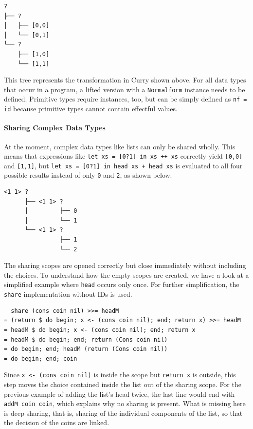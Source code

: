 \documentclass[a4paper, 11pt, fleqn, twoside]{scrreprt}
\newcommand{\hinl}[1]{\texttt{#1}}
\begin{document}
\begin{verbatim}
? 
├── ? 
│   ├── [0,0]
│   └── [0,1]
└── ? 
    ├── [1,0]
    └── [1,1]
\end{verbatim}

This tree represents the transformation in Curry shown above.
For all data types that occur in a program, a lifted version with a \hinl{Normalform} instance needs to be defined.
Primitive types require instances, too, but can be simply defined as \hinl{nf = id} because primitive types cannot contain effectful values.

\paragraph{Sharing Complex Data Types}
At the moment, complex data types like lists can only be shared wholly.
This means that expressions like \hinl{let xs = [0?1] in xs ++ xs} correctly yield \hinl{[0,0]} and \hinl{[1,1]}, but \hinl{let xs = [0?1] in head xs + head xs} is evaluated to all four possible results instead of only \hinl{0} and \hinl{2}, as shown below.

\begin{verbatim}
<1 1> ? 
      ├── <1 1> ? 
      │         ├── 0
      │         └── 1
      └── <1 1> ? 
                ├── 1
                └── 2
\end{verbatim}

The sharing scopes are opened correctly but close immediately without including the choices.
To understand how the empty scopes are created, we have a look at a simplified example where \hinl{head} occurs only once.
For further simplification, the \hinl{share} implementation without IDs is used.

\begin{verbatim}
  share (cons coin nil) >>= headM
= (return $ do begin; x <- (cons coin nil); end; return x) >>= headM
= headM $ do begin; x <- (cons coin nil); end; return x
= headM $ do begin; end; return (Cons coin nil)
= do begin; end; headM (return (Cons coin nil))
= do begin; end; coin
\end{verbatim}

Since \hinl{x <- (cons coin nil)} is inside the scope but \hinl{return x} is outside, this step moves the choice contained inside the list out of the sharing scope.
For the previous example of adding the list's head twice, the last line would end with \hinl{addM coin coin}, which explains why no sharing is present.
What is missing here is deep sharing, that is, sharing of the individual components of the list, so that the decision of the coins are linked.
\end{document}
